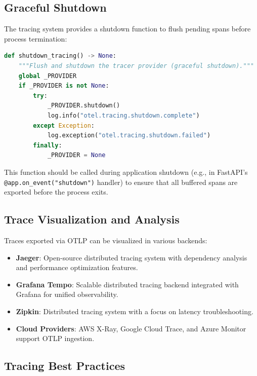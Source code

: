 \subsection{Graceful Shutdown}

The tracing system provides a shutdown function to flush pending spans before process termination:

\begin{lstlisting}[language=Python, caption={Trace provider shutdown}]
def shutdown_tracing() -> None:
    """Flush and shutdown the tracer provider (graceful shutdown)."""
    global _PROVIDER
    if _PROVIDER is not None:
        try:
            _PROVIDER.shutdown()
            log.info("otel.tracing.shutdown.complete")
        except Exception:
            log.exception("otel.tracing.shutdown.failed")
        finally:
            _PROVIDER = None
\end{lstlisting}

This function should be called during application shutdown (e.g., in FastAPI's \texttt{@app.on\_event("shutdown")} handler) to ensure that all buffered spans are exported before the process exits.

\subsection{Trace Visualization and Analysis}

Traces exported via OTLP can be visualized in various backends:

\begin{itemize}
    \item \textbf{Jaeger}: Open-source distributed tracing system with dependency analysis and performance optimization features.
    
    \item \textbf{Grafana Tempo}: Scalable distributed tracing backend integrated with Grafana for unified observability.
    
    \item \textbf{Zipkin}: Distributed tracing system with a focus on latency troubleshooting.
    
    \item \textbf{Cloud Providers}: AWS X-Ray, Google Cloud Trace, and Azure Monitor support OTLP ingestion.
\end{itemize}

\subsection{Tracing Best Practices}

